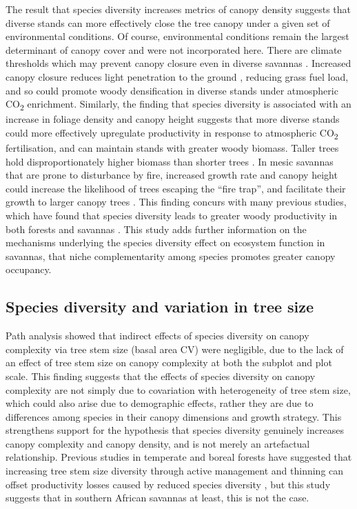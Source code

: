 \begin{refsection}
The result that species diversity increases metrics of canopy density suggests that diverse stands can more effectively close the tree canopy under a given set of environmental conditions. Of course, environmental conditions remain the largest determinant of canopy cover and were not incorporated here. There are climate thresholds which may prevent canopy closure even in diverse savannas \citep{Devine2017}. Increased canopy closure reduces light penetration to the ground \citep{Pilon2020}, reducing grass fuel load, and so could promote woody densification in diverse stands under atmospheric CO\textsubscript{2} enrichment. Similarly, the finding that species diversity is associated with an increase in foliage density and canopy height suggests that more diverse stands could more effectively upregulate productivity in response to atmospheric CO\textsubscript{2} fertilisation, and can maintain stands with greater woody biomass. Taller trees hold disproportionately higher biomass than shorter trees \citep{King1990}. In mesic savannas that are prone to disturbance by fire, increased growth rate and canopy height could increase the likelihood of trees escaping the ``fire trap'', and facilitate their growth to larger canopy trees \citep{Wakeling2011}. This finding concurs with many previous studies, which have found that species diversity leads to greater woody productivity in both forests and savannas \citep{Plas2019, Liang2016}. This study adds further information on the mechanisms underlying the species diversity effect on ecosystem function in savannas, that niche complementarity among species promotes greater canopy occupancy.

\subsection{Species diversity and variation in tree size}
\label{tls:ssec:diversity}

Path analysis showed that indirect effects of species diversity on canopy complexity via tree stem size (basal area CV) were negligible, due to the lack of an effect of tree stem size on canopy complexity at both the subplot and plot scale. This finding suggests that the effects of species diversity on canopy complexity are not simply due to covariation with heterogeneity of tree stem size, which could also arise due to demographic effects, rather they are due to differences among species in their canopy dimensions and growth strategy. This strengthens support for the hypothesis that species diversity genuinely increases canopy complexity and canopy density, and is not merely an artefactual relationship. Previous studies in temperate and boreal forests have suggested that increasing tree stem size diversity through active management and thinning can offset productivity losses caused by reduced species diversity \citep{Levick2009}, but this study suggests that in southern African savannas at least, this is not the case. 


\end{refsection}
